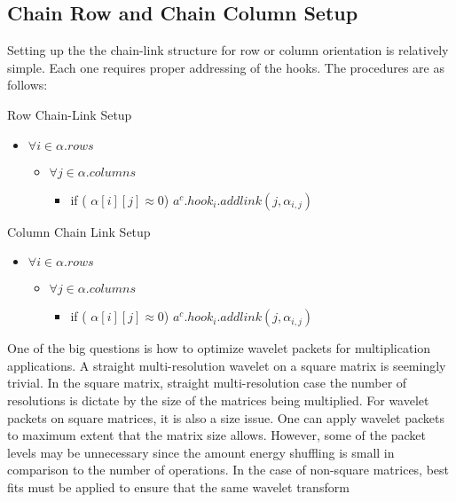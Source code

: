 \subsection{Chain Row and Chain Column Setup}
Setting up the the chain-link structure for row or column orientation is relatively simple.  Each one requires proper addressing of the hooks.  The procedures are as follows:

Row Chain-Link Setup
\begin{itemize}
\item $\forall i  \in \alpha .rows$
\begin{itemize}
\item $\forall j \in \alpha . columns$
\begin{itemize}
\item if ( $\alpha [i][j] \approx 0 $)
$a^c.hook_i . addlink(j,\alpha_{i,j} ) $
\end{itemize}

\end{itemize}

\end{itemize}

Column Chain Link Setup
\begin{itemize}
\item $\forall i  \in \alpha .rows$
\begin{itemize}
\item $\forall j \in \alpha . columns$
\begin{itemize}
\item if ( $\alpha [i][j] \approx 0 $)
$a^c.hook_i . addlink(j,\alpha_{i,j} ) $
\end{itemize}

\end{itemize}

\end{itemize}

One of the big questions is how to optimize wavelet packets for multiplication applications.  A straight multi-resolution wavelet on a square matrix is seemingly trivial.  In the square matrix, straight multi-resolution case the number of resolutions is dictate by the size of the matrices being multiplied.  For wavelet packets on square matrices, it is also a size issue.  One can apply wavelet packets to maximum extent that the matrix size allows.  However, some of the packet levels may be unnecessary since the amount energy shuffling is small in comparison to the number of operations.  In the case of non-square matrices, best fits must be applied to ensure that the same wavelet transform 

